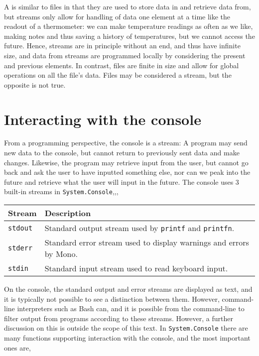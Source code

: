 A  is similar to files in that they are used to store data in and retrieve data from, but streams only allow for handling of data one element at a time like the readout of a thermometer: we can make temperature readings as often as we like, making notes and thus saving a history of temperatures, but we cannot access the future. Hence, streams are in principle without an end, and thus have infinite size, and data from streams are programmed locally by considering the present and previous elements. In contrast, files are finite in size and allow for global operations on all the file's data. Files may be considered a stream, but the opposite is not true.

\section{Interacting with the console}
From a programming perspective, the console is a stream: A program may send new data to the console, but cannot return to previously sent data and make changes. Likewise, the program may retrieve input from the user, but cannot go back and ask the user to have inputted something else, nor can we peak into the future and retrieve what the user will input in the future. The console uses 3 built-in streams in \lstinline!System.Console!,,,
\begin{center}
  \begin{tabularx}{\linewidth}{|l|X|}
    \hline
    \rowcolor{headerRowColor} Stream & Description\\
    \hline
    \lstinline{stdout} & Standard output stream used by \lstinline!printf! and \lstinline!printfn!.\\
    \hline
    \lstinline{stderr} & Standard error stream used to display warnings and errors by Mono.\\
    \hline
    \lstinline{stdin} & Standard input stream used to read keyboard input.\\
    \hline
  \end{tabularx}
\end{center}
  On the console, the standard output and error streams are displayed as text, and it is typically not possible to see a distinction between them. However, command-line interpreters such as Bash can, and it is possible from the command-line to filter output from programs according to these streams. However, a further discussion on this is outside the scope of this text. In \lstinline!System.Console! there are many functions supporting interaction with the console, and the most important ones are,
